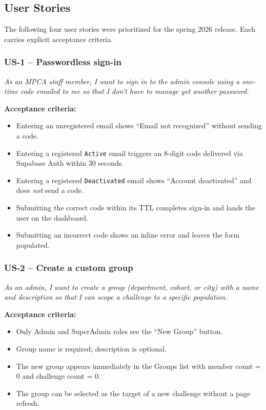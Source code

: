 \documentclass[11pt,letterpaper]{article}
\begin{document}
\subsection{User Stories}

The following four user stories were prioritized for the spring 2026
release. Each carries explicit acceptance criteria.

\subsubsection*{US-1 -- Passwordless sign-in}

\textit{As an MPCA staff member, I want to sign in to the admin console
using a one-time code emailed to me so that I don't have to manage yet
another password.}

\textbf{Acceptance criteria:}
\begin{itemize}[noitemsep]
  \item Entering an unregistered email shows ``Email not recognized''
        without sending a code.
  \item Entering a registered \texttt{Active} email triggers an
        8-digit code delivered via Supabase Auth within 30 seconds.
  \item Entering a registered \texttt{Deactivated} email shows
        ``Account deactivated'' and does \emph{not} send a code.
  \item Submitting the correct code within its TTL completes sign-in
        and lands the user on the dashboard.
  \item Submitting an incorrect code shows an inline error and leaves
        the form populated.
\end{itemize}

\subsubsection*{US-2 -- Create a custom group}

\textit{As an admin, I want to create a group (department, cohort, or
city) with a name and description so that I can scope a challenge to a
specific population.}

\textbf{Acceptance criteria:}
\begin{itemize}[noitemsep]
  \item Only Admin and SuperAdmin roles see the ``New Group'' button.
  \item Group name is required; description is optional.
  \item The new group appears immediately in the Groups list with
        member count = 0 and challenge count = 0.
  \item The group can be selected as the target of a new challenge
        without a page refresh.
\end{itemize}
\end{document}
